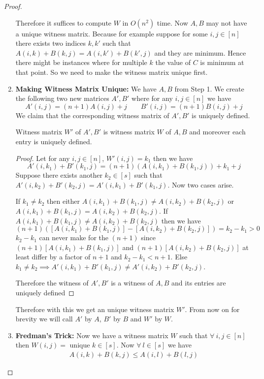 \begin{proof}
\begin{enumerate}[wide, label=\bfseries Step \arabic*,itemindent=0.5cm]
Therefore it suffices to compute $W$ in $O(n^2)$ time. Now $A,B$ may not have a unique witness matrix. Because for example suppose for some $i,j\in[n]$ there exists two indices $k,k'$ such that $A(i,k)+B(k,j)=A(i,k')+B(k',j)$ and they are minimum. Hence there might be instances where for multiple $k$ the value of $C$ is minimum at that point. So we need to make the witness matrix unique first.
\item \textbf{Making Witness Matrix Unique:} We have $A,B$ from Step 1. We create the following two new matrices $A',B'$ where for any $i,j\in[n]$ we have $$A'(i,j)=(n+1)A(i,j)+j\qquad B'(i,j)=(n+1)B(i,j)+j$$We claim that the corresponding witness matrix of $A',B'$ is uniquely defined.\parinn
\begin{claimwidth}
	\begin{Claim}{}{}
		Witness matrix $W'$ of $A',B'$ is witness matrix $W$ of $A,B$ and moreover each entry is uniquely defined.
	\end{Claim}
\begin{proof}
	Let for any $i,j\in[n]$, $W'(i,j)=k_1$ then we have $$A'(i,k_1)+B'(k_1,j)=(n+1)(A(i,k_1)+B(k_1,j))+k_1+j$$Suppose there exists another $k_2\in[s]$ such that $A'(i,k_2)+B'(k_2,j)=A'(i,k_1)+B'(k_1,j)$. Now two cases arise. \parinn
	
	If $k_1\neq k_2$ then either $A(i,k_1)+B(k_1,j)\neq A(i,k_2)+B(k_2,j)$ or $A(i,k_1)+B(k_1,j)= A(i,k_2)+B(k_2,j)$. If $A(i,k_1)+B(k_1,j)\neq A(i,k_2)+B(k_2,j)$ then we have $$(n+1)([A(i,k_1)+B(k_1,j)]-[A(i,k_2)+B(k_2,j)])=k_2-k_1>0$$ $k_2-k_1$ can never make for the $(n+1)$ since $(n+1)[A(i,k_1)+B(k_1,j)]$ and $(n+1)[ A(i,k_2)+B(k_2,j)]$ at least differ by a factor of $n+1$ and $k_2-k_1< n+1$. Else $k_1\neq k_2\implies A'(i,k_1)+B'(k_1,j)\neq A'(i,k_2)+B'(k_2,j)$.
	
	Therefore the witness of $A',B'$ is a witness of $A,B$ and its entries are uniquely defined
\end{proof}
\end{claimwidth}
Therefore with this we get an unique witness matrix $W'$. From now on for brevity we will call $A'$ by $A$, $B'$ by $B$ and $W'$ by $W$. 
\item \textbf{Fredman's Trick:} Now we have a witness matrix $W$ such that $\forall\ i,j\in[n]$ then $W(i,j)=$ unique $k\in[s]$. Now $\forall\ l\in [s]$ we have \begin{align*}
	A(i,k)+B(k,j) \leq A(i,l)+B(l,j)
\end{align*}
	\end{enumerate}

\end{proof}